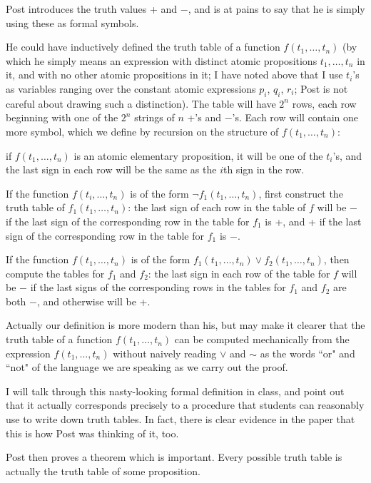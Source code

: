 \documentclass[12pt]{article}
\begin{document}
Post introduces the truth values + and $-$, and is at pains to say that he is simply using these as formal symbols.

He could have inductively defined the truth table of a function $f(t_1,\ldots,t_n)$ (by which he simply means an expression with distinct atomic propositions $t_1,\ldots,t_n$ in it, and with no other atomic propositions in it;  I have noted above that I use $t_i$'s as variables ranging over the constant atomic expressions $p_i$, $q_i$, $r_i$;  Post is not careful about drawing such a distinction).  The  table
will have $2^n$ rows, each row beginning with one of the $2^n$ strings of $n$ +'s and $-$'s.  Each row will contain one more symbol, which we define by recursion on the structure of
$f(t_1,\ldots,t_n)$:  

if $f(t_1,\ldots,t_n)$ is an atomic elementary proposition, it will be one of the $t_i$'s, and the last sign in each  row will be the same as the $i$th sign in the row.

If the function $f(t_i,\ldots,t_n)$ is of the form $\neg f_1(t_1,\ldots,t_n)$, first construct the truth table of $f_1(t_1,\ldots,t_n)$:  the last sign of each row 
in the table of $f$ will be $-$ if the last sign of the corresponding row in the table for $f_1$ is +, and + if the last sign of the corresponding  row in the table for $f_1$ is $-$.

If the function $f(t_1,\ldots,t_n)$ is of the form $f_1(t_1,\ldots,t_n) \vee f_2(t_1,\ldots,t_n)$, then compute the tables for $f_1$ and $f_2$:  the last sign in each row
of the table for $f$ will be $-$ if the last signs of the corresponding rows in the tables for $f_1$ and $f_2$ are both $-$, and otherwise will be +.

Actually our definition is more modern than his, but may make it clearer that the truth table of a function $f(t_1,\ldots,t_n)$ can be computed mechanically from the expression $f(t_1,\ldots,t_n)$ without naively reading $\vee$ and $\sim$ as the words ``or" and ``not" of the language we are speaking as we carry out the proof.

I will talk through this nasty-looking formal definition in class, and point out that it actually corresponds precisely to a procedure that students can reasonably use to write down truth tables.  In fact, there is clear evidence in the paper that this is how Post was thinking of it, too.

Post then proves a theorem which is important.  Every possible truth table is actually the truth table of some proposition.
\end{document}
